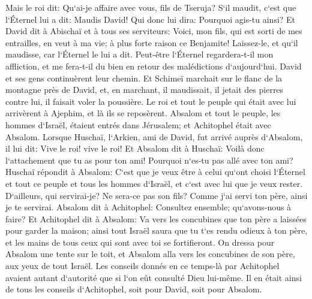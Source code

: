 \verse Mais le roi dit: Qu`ai-je affaire avec vous, fils de Tseruja? S`il maudit, c`est que l`Éternel lui a dit: Maudis David! Qui donc lui dira: Pourquoi agis-tu ainsi? 
\verse Et David dit à Abischaï et à tous ses serviteurs: Voici, mon fils, qui est sorti de mes entrailles, en veut à ma vie; à plus forte raison ce Benjamite! Laissez-le, et qu`il maudisse, car l`Éternel le lui a dit. 
\verse Peut-être l`Éternel regardera-t-il mon affliction, et me fera-t-il du bien en retour des malédictions d`aujourd`hui. 
\verse David et ses gens continuèrent leur chemin. Et Schimeï marchait sur le flanc de la montagne près de David, et, en marchant, il maudissait, il jetait des pierres contre lui, il faisait voler la poussière. 
\verse Le roi et tout le peuple qui était avec lui arrivèrent à Ajephim, et là ils se reposèrent. 
\verse Absalom et tout le peuple, les hommes d`Israël, étaient entrés dans Jérusalem; et Achitophel était avec Absalom. 
\verse Lorsque Huschaï, l`Arkien, ami de David, fut arrivé auprès d`Absalom, il lui dit: Vive le roi! vive le roi! 
\verse Et Absalom dit à Huschaï: Voilà donc l`attachement que tu as pour ton ami! Pourquoi n`es-tu pas allé avec ton ami? 
\verse Huschaï répondit à Absalom: C`est que je veux être à celui qu`ont choisi l`Éternel et tout ce peuple et tous les hommes d`Israël, et c`est avec lui que je veux rester. 
\verse D`ailleurs, qui servirai-je? Ne sera-ce pas son fils? Comme j`ai servi ton père, ainsi je te servirai. 
\verse Absalom dit à Achitophel: Consultez ensemble; qu`avons-nous à faire? 
\verse Et Achitophel dit à Absalom: Va vers les concubines que ton père a laissées pour garder la maison; ainsi tout Israël saura que tu t`es rendu odieux à ton père, et les mains de tous ceux qui sont avec toi se fortifieront. 
\verse On dressa pour Absalom une tente sur le toit, et Absalom alla vers les concubines de son père, aux yeux de tout Israël. 
\verse Les conseils donnés en ce temps-là par Achitophel avaient autant d`autorité que si l`on eût consulté Dieu lui-même. Il en était ainsi de tous les conseils d`Achitophel, soit pour David, soit pour Absalom. 

